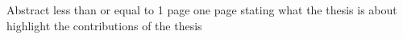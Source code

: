 Abstract less than or equal to 1 page
one page stating what the thesis is about
highlight the contributions of the thesis